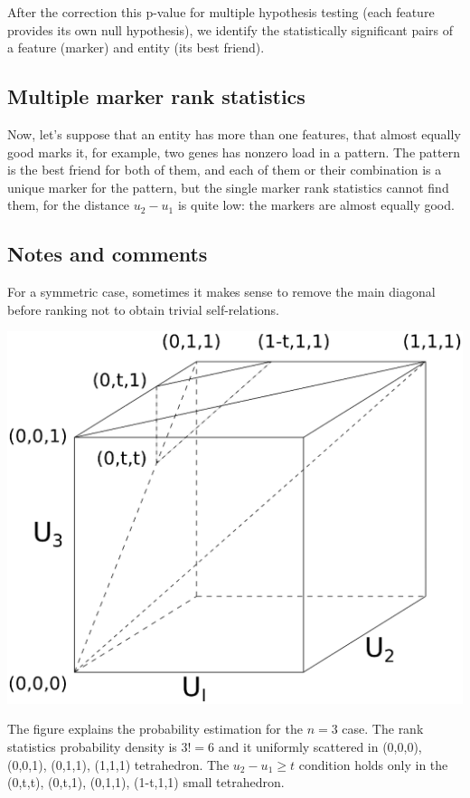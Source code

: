 \documentclass{llncs}
\begin{document}
After the correction this p-value for multiple hypothesis testing (each feature provides its own null hypothesis), we identify the statistically significant pairs of a feature (marker) and entity (its best friend).

\subsection{Multiple marker rank statistics}
Now, let's suppose that an entity has more than one features, that almost equally good marks it, for example, two genes has nonzero load in a pattern. The pattern is the best friend for both of them, and each of them or their combination is a unique marker for the pattern, but the single marker rank statistics cannot find them, for the distance $u_2-u_1$ is quite low: the markers are almost equally good.

\subsection*{Notes and comments}

For a symmetric case, sometimes it makes sense to remove the main diagonal before ranking not to obtain trivial self-relations.

\includegraphics[scale=.5,trim=0 10cm 0 0, clip=true]{rank3d-nocolour}

The figure explains the probability estimation for the $n=3$ case. The rank statistics probability density is $3!=6$ and it uniformly scattered in (0,0,0), (0,0,1), (0,1,1), (1,1,1) tetrahedron. The $u_2 - u_1 \ge t$ condition holds only in the (0,t,t), (0,t,1), (0,1,1), (1-t,1,1) small tetrahedron.
\end{document}
